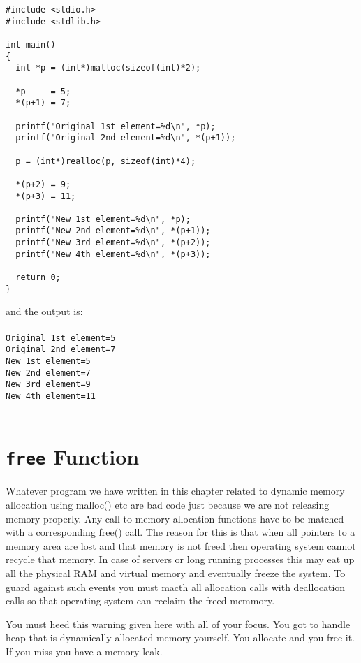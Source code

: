 \begin{verbatim}
#include <stdio.h>
#include <stdlib.h>

int main()
{
  int *p = (int*)malloc(sizeof(int)*2);

  *p     = 5;
  *(p+1) = 7;

  printf("Original 1st element=%d\n", *p);
  printf("Original 2nd element=%d\n", *(p+1));

  p = (int*)realloc(p, sizeof(int)*4);

  *(p+2) = 9;
  *(p+3) = 11;

  printf("New 1st element=%d\n", *p);
  printf("New 2nd element=%d\n", *(p+1));
  printf("New 3rd element=%d\n", *(p+2));
  printf("New 4th element=%d\n", *(p+3));

  return 0;
}
\end{verbatim}
and the output is:
\\\\\texttt{Original 1st element=5\\
Original 2nd element=7\\
New 1st element=5\\
New 2nd element=7\\
New 3rd element=9\\
New 4th element=11\\\\}

\section{\texttt{free} Function}
Whatever program we have written in this chapter related to dynamic memory
allocation using malloc() etc are bad code just because we are not releasing
memory properly. Any call to memory allocation functions have to be matched
with a corresponding free() call. The reason for this is that when all pointers
to a memory area are lost and that memory is not freed then operating system
cannot recycle that memory. In case of servers or long running processes this
may eat up all the physical RAM and virtual memory and eventually freeze the
system. To guard against such events you must macth all allocation calls with
deallocation calls so that operating system can reclaim the freed memmory.

You must heed this warning given here with all of your focus. You got to handle
heap that is dynamically allocated memory yourself. You allocate and you free
it. If you miss you have a memory leak.

